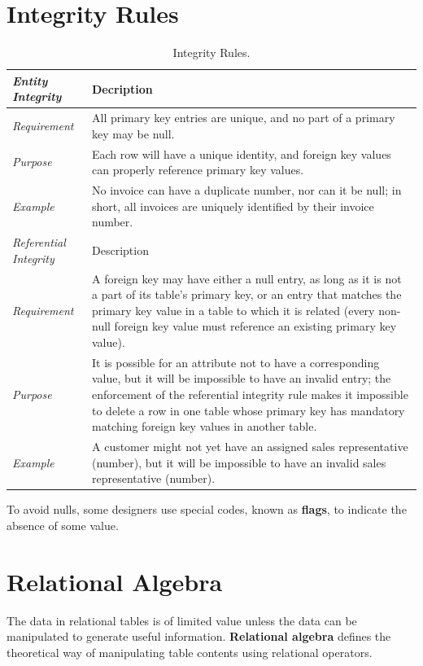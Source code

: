 \documentclass[a4paper, 12pt, titlepage]{report}
\begin{document}
\section{Integrity Rules}
\begin{center}
\begin{longtable}{ p{1.75cm} p{13cm} }
\caption{Integrity Rules.\label{long}}\\
\hline
\hline
\emph{Entity Integrity} & Decription\\
\hline 
\emph{Requirement} & All primary key entries are unique, and no part of a primary key may be null.\\
\emph{Purpose} & Each row will have a unique identity, and foreign key values can properly reference primary key values.\\
\emph{Example} & No invoice can have a duplicate number, nor can it be null; in short, all invoices are uniquely identified by their invoice number.\\
\hline
\emph{Referential Integrity} & Description\\
\hline
\emph{Requirement} & A foreign key may have either a null entry, as long as it is not a part of its table’s primary key, or an entry that matches the primary key value in a table to which it is related (every non-null foreign key value must reference an existing primary key value).\\ 
\emph{Purpose} & It is possible for an attribute not to have a corresponding value, but it will be impossible to have an invalid entry; the enforcement of the referential integrity rule makes it impossible to delete a row in one table whose primary key has mandatory matching foreign key values in another table.\\
\emph{Example} & A customer might not yet have an assigned sales representative (number), but it will be impossible to have an invalid sales representative (number).\\
\hline
\hline
\end{longtable}
\end{center}
To avoid nulls, some designers use special codes, known as \textbf{flags}, to indicate the absence of some value.

\section{Relational Algebra}
The data in relational tables is of limited value unless the data can be manipulated to generate useful information. \textbf{Relational algebra} defines the theoretical way of
manipulating table contents using relational operators.
\end{document}
